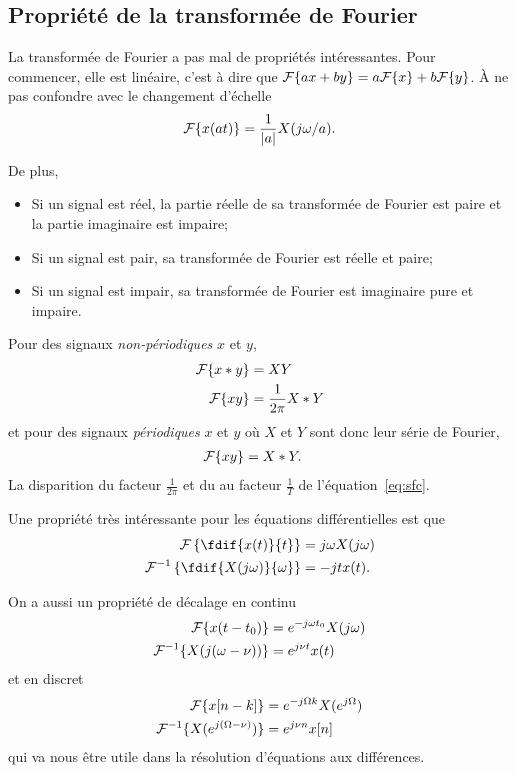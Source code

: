 \subsection{Propriété de la transformée de Fourier}
La transformée de Fourier a pas mal de propriétés intéressantes.
Pour commencer, elle est linéaire, c'est à dire que
$\mathcal{F}\{ax + by\} = a\mathcal{F}\{x\} + b\mathcal{F}\{y\}$.
À ne pas confondre avec le changement d'échelle
\[ \mathcal{F}\{x(at)\} = \frac{1}{|a|}X(j\omega/a). \]

De plus,
\begin{itemize}
  \item Si un signal est réel,
    la partie réelle de sa transformée de Fourier est paire et
    la partie imaginaire est impaire;
  \item Si un signal est pair, sa transformée de Fourier est réelle et paire;
  \item Si un signal est impair,
    sa transformée de Fourier est imaginaire pure et impaire.
\end{itemize}

Pour des signaux \emph{non-périodiques} $x$ et $y$,
\begin{align}
  \nonumber
  \mathcal{F}\{x * y\} & = X Y\\
  \label{eq:prod2conv}
  \mathcal{F}\{xy\} & = \frac{1}{2\pi}X * Y
\end{align}
et pour des signaux \emph{périodiques} $x$ et $y$
où $X$ et $Y$ sont donc leur série de Fourier,
\begin{align*}
  \mathcal{F}\{xy\} & = X * Y.
\end{align*}
La disparition du facteur $\frac{1}{2\pi}$ et du au facteur
$\frac{1}{T}$ de l'équation~\eqref{eq:sfc}.

Une propriété très intéressante pour les équations différentielles est que
\begin{align*}
  \fourier\left\{\fdif{x(t)}{t}\right\} & = j\omega X(j\omega)\\
  \fourier^{-1}\left\{\fdif{X(j\omega)}{\omega}\right\} & =
  -jtx(t).
\end{align*}

On a aussi un propriété de décalage en continu
\begin{align*}
  \mathcal{F}\{x(t-t_0)\} & = e^{-j\omega t_0}X(j\omega)\\
  \mathcal{F}^{-1}\{X(j(\omega-\nu))\} & = e^{j\nu t}x(t)
\end{align*}
et en discret
\begin{align*}
  \mathcal{F}\{x[n-k]\} & = e^{-j\Omega k} X(e^{j\Omega})\\
  \mathcal{F}^{-1}\{X(e^{j(\Omega-\nu)})\} & = e^{j\nu n}x[n]
\end{align*}
qui va nous être utile dans la résolution d'équations aux différences.

